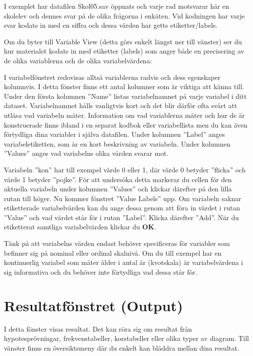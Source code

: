 \documentclass[
]{book}
\begin{document}
I exemplet har datafilen Skol05.sav öppnats och varje rad motsvarar här en skolelev och dennes svar på
de olika frågorna i enkäten. Vid kodningen har varje svar kodats in med en siffra och dessa värden har
getts etiketter/labels.

Om du byter till Variable View (detta görs enkelt längst ner till vänster) ser du hur materialet kodats in
med etiketter (labels) som anger både en precisering av de olika variablerna och de olika variabelvärdena:

I variabelfönstret redovisas alltså variablerna radvis och dess egenskaper kolumnvis. I detta fönster finns ett antal kolumner som är viktiga att känna till. Under den första kolumnen ''Name'' listas variabelnamnet på varje variabel i ditt dataset. Variabelnamnet hålls vanligtvis kort och det blir därför ofta svårt att utläsa vad variabeln mäter. Information om vad variablerna mäter och hur de är konstruerade finns ibland i en separat kodbok eller variabellista men du kan även förtydliga dina variabler i själva datafilen. Under kolumnen ''Label'' anges variabeletiketten, som är en kort beskrivning av variabeln. Under kolumnen ''Values'' anges vad variabelns olika värden svarar mot.

Variabeln ''kon'' har till exempel värde 0 eller 1, där värde 0 betyder ''flicka'' och värde 1 betyder ''pojke''. För att undersöka detta markerar du cellen för den aktuella variabeln under kolumnen ''Values'' och klickar därefter på den lilla rutan till höger. Nu kommer fönstret ''Value Labels'' upp. Om variabeln saknar etiketterade variabelvärden kan du ange dessa genom att föra in värdet i rutan ''Value'' och vad värdet står för i rutan ''Label''. Klicka därefter ''Add''. När du etiketterat samtliga variabelvärden klickar du \textbf{OK}.

Tänk på att variabelns värden endast behöver specificeras för variabler som befinner sig på nominal eller ordinal skalnivå. Om du till exempel har en kontinuerlig variabel som mäter ålder i antal år (kvotskala) är variabelvärdena i sig informativa och du behöver inte förtydliga vad dessa står för.

\hypertarget{resultatfuxf6nstret-output}{%
\section{Resultatfönstret (Output)}\label{resultatfuxf6nstret-output}}

I detta fönster visas resultat. Det kan röra sig om resultat från hypotesprövningar, frekvenstabeller, korstabeller eller olika typer av diagram. Till vänster finns en översiktsmeny där du enkelt kan bläddra mellan dina resultat.
\end{document}
